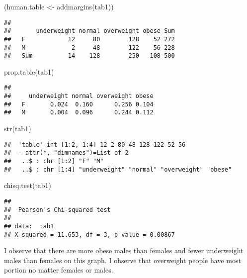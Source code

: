 \documentclass[
]{article}
\newenvironment{Shaded}{\begin{snugshade}}{\end{snugshade}}
\newcommand{\FunctionTok}[1]{\textcolor[rgb]{0.00,0.00,0.00}{#1}}
\newcommand{\NormalTok}[1]{#1}
\newcommand{\OtherTok}[1]{\textcolor[rgb]{0.56,0.35,0.01}{#1}}
\begin{document}
\begin{Shaded}
\begin{Highlighting}[]
\NormalTok{(human.table }\OtherTok{\textless{}{-}} \FunctionTok{addmargins}\NormalTok{(tab1))}
\end{Highlighting}
\end{Shaded}

\begin{verbatim}
##      
##       underweight normal overweight obese Sum
##   F            12     80        128    52 272
##   M             2     48        122    56 228
##   Sum          14    128        250   108 500
\end{verbatim}

\begin{Shaded}
\begin{Highlighting}[]
\FunctionTok{prop.table}\NormalTok{(tab1)}
\end{Highlighting}
\end{Shaded}

\begin{verbatim}
##    
##     underweight normal overweight obese
##   F       0.024  0.160      0.256 0.104
##   M       0.004  0.096      0.244 0.112
\end{verbatim}

\begin{Shaded}
\begin{Highlighting}[]
\FunctionTok{str}\NormalTok{(tab1)}
\end{Highlighting}
\end{Shaded}

\begin{verbatim}
##  'table' int [1:2, 1:4] 12 2 80 48 128 122 52 56
##  - attr(*, "dimnames")=List of 2
##   ..$ : chr [1:2] "F" "M"
##   ..$ : chr [1:4] "underweight" "normal" "overweight" "obese"
\end{verbatim}

\begin{Shaded}
\begin{Highlighting}[]
\FunctionTok{chisq.test}\NormalTok{(tab1)}
\end{Highlighting}
\end{Shaded}

\begin{verbatim}
## 
##  Pearson's Chi-squared test
## 
## data:  tab1
## X-squared = 11.653, df = 3, p-value = 0.00867
\end{verbatim}

I observe that there are more obese males than females and fewer
underweight males than females on this graph. I observe that overweight
people have most portion no matter females or males.
\end{document}
